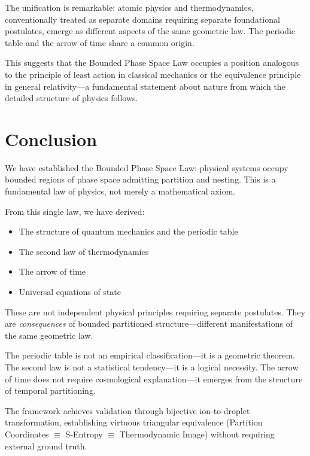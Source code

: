 \documentclass[twocolumn,10pt,a4paper]{article}
\theoremstyle{definition}
\theoremstyle{remark}
\begin{document}
The unification is remarkable: atomic physics and thermodynamics, conventionally treated as separate domains requiring separate foundational postulates, emerge as different aspects of the same geometric law. The periodic table and the arrow of time share a common origin.

This suggests that the Bounded Phase Space Law occupies a position analogous to the principle of least action in classical mechanics or the equivalence principle in general relativity---a fundamental statement about nature from which the detailed structure of physics follows.

\section{Conclusion}
\label{sec:conclusion}

We have established the Bounded Phase Space Law: physical systems occupy bounded regions of phase space admitting partition and nesting. This is a fundamental law of physics, not merely a mathematical axiom.

From this single law, we have derived:
\begin{itemize}
    \item The structure of quantum mechanics and the periodic table
    \item The second law of thermodynamics
    \item The arrow of time
    \item Universal equations of state
\end{itemize}

These are not independent physical principles requiring separate postulates. They are \emph{consequences} of bounded partitioned structure---different manifestations of the same geometric law.

The periodic table is not an empirical classification---it is a geometric theorem. The second law is not a statistical tendency---it is a logical necessity. The arrow of time does not require cosmological explanation---it emerges from the structure of temporal partitioning.

The framework achieves validation through bijective ion-to-droplet transformation, establishing virtuous triangular equivalence (Partition Coordinates $\equiv$ S-Entropy $\equiv$ Thermodynamic Image) without requiring external ground truth.
\end{document}
